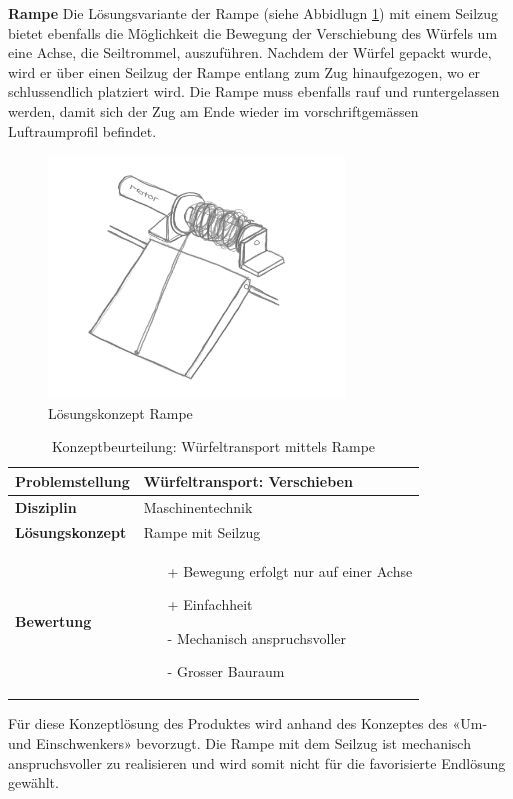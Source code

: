 \documentclass[../../../main.tex]{subfiles}
\begin{document}
\textbf{Rampe}
Die Lösungsvariante der Rampe (siehe Abbidlugn \ref{fig:rampe}) mit einem Seilzug bietet ebenfalls die Möglichkeit die Bewegung der Verschiebung des Würfels um eine Achse, die Seiltrommel, auszuführen. Nachdem der Würfel gepackt wurde, wird er über einen Seilzug der Rampe entlang zum Zug hinaufgezogen, wo er schlussendlich platziert wird. Die Rampe muss ebenfalls rauf und runtergelassen werden, damit sich der Zug am Ende wieder im vorschriftgemässen Luftraumprofil befindet.

\begin{figure}[H] %
    \centering
    \includegraphics[width=0.7\textwidth]{Rampe}
    \caption{Lösungskonzept Rampe}
    \label{fig:rampe}
\end{figure}

\begin{flushleft}
    \begin{table}[h]
    \begin{tabular}{ | l | p{11cm} |}
    \hline
    \textbf{Problemstellung} & Würfeltransport: Verschieben \\ \hline
    \textbf{Disziplin} & Maschinentechnik \\ \hline
    \textbf{Lösungskonzept} &  Rampe mit Seilzug \\ \hline
    \textbf{Bewertung} &  \begin{itemize}
                            \item[+] Bewegung erfolgt nur auf einer Achse
                            \item[+] Einfachheit
                            \item[-] Mechanisch anspruchsvoller
                            \item[-] Grosser Bauraum
                          \end{itemize} \\ \hline
    \end{tabular}
    \caption{Konzeptbeurteilung: Würfeltransport mittels Rampe}
    \label{tab:konzept_wurfeltrransport_umschwenker}
\end{table}
\end{flushleft}
Für diese Konzeptlösung des Produktes wird anhand des Konzeptes des «Um- und Einschwenkers» bevorzugt. Die Rampe mit dem Seilzug ist mechanisch anspruchsvoller zu realisieren und wird somit nicht für die favorisierte Endlösung gewählt.
\end{document}

